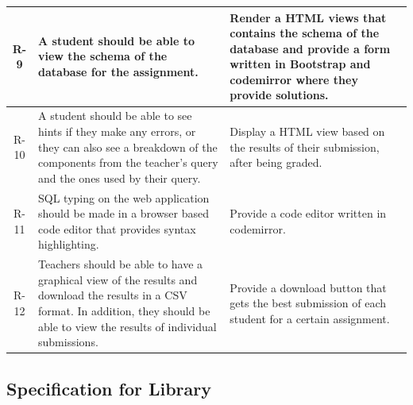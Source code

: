 \begin{tabularx}{\textwidth}{|c|Y|Y|}
  R-9 & A student should be able to view the schema of the database for the assignment. & Render a HTML views that contains the schema of the database and provide a form written in Bootstrap and codemirror where they provide solutions. \\\hline
  R-10 & A  student  should  be  able  to  see  hints  if  they  make  any  errors,  or  they  can  also  see  a breakdown of the components from the teacher’s query and the ones used by their query. & Display a HTML view based on the results of their submission, after being graded. \\\hline
  R-11 & SQL typing on the web application should be made in a browser based code editor that provides syntax highlighting. & Provide a code editor written in codemirror. \\\hline
  R-12 & Teachers should be able to have a graphical view of the results and download the results in  a CSV format.   In  addition,  they  should  be  able  to  view  the  results  of  individual submissions. & Provide a download button that gets the best submission of each student for a certain assignment. \\\hline
\end{tabularx}

\subsection{Specification for Library}

